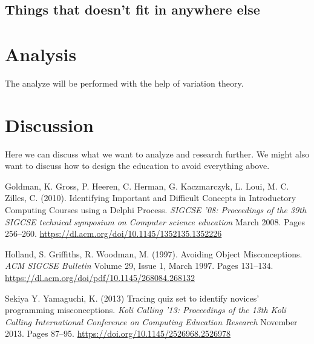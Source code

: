 \documentclass[twocolumn]{article}
\begin{document}







\subsection{Things that doesn't fit in anywhere else}




\section{Analysis}

The analyze will be performed with the help of variation theory. 

\section{Discussion}

Here we can discuss what we want to analyze and research further. We might also want to discuss how to design the education to avoid everything above.

\newpage

\begin{thebibliography}{9}

Goldman, K. Gross, P. Heeren, C. Herman, G. Kaczmarczyk, L. Loui, M. C. Zilles, C. (2010). Identifying Important and Difficult Concepts in Introductory Computing Courses using a Delphi Process. \emph{SIGCSE '08: Proceedings of the 39th SIGCSE technical symposium on Computer science education} March 2008. Pages 256–260.
\url{https://dl.acm.org/doi/10.1145/1352135.1352226} 

Holland, S. Griffiths, R. Woodman, M. (1997). Avoiding Object Misconceptions. \emph{ACM SIGCSE Bulletin} Volume 29, Issue 1, March 1997. Pages 131–134.
\url{https://dl.acm.org/doi/pdf/10.1145/268084.268132} 

Sekiya Y. Yamaguchi, K. (2013) Tracing quiz set to identify novices' programming misconceptions. \emph{Koli Calling '13: Proceedings of the 13th Koli Calling International Conference on Computing Education Research} November 2013. Pages 87–95.
\url{https://doi.org/10.1145/2526968.2526978} 

\end{thebibliography}
\printbibliography
\end{document}
